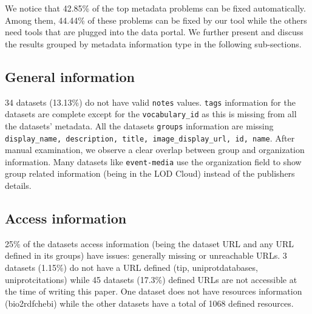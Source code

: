 \documentclass[runningheads,a4paper]{../../Util/LaTEX/llncs}
\begin{document}
We notice that 42.85\% of the top metadata problems can be fixed automatically. Among them, 44.44\% of these problems can be fixed by our tool while the others need tools that are plugged into the data portal. We further present and discuss the results grouped by metadata information type in the following sub-sections.

\subsection{General information}
34 datasets (13.13\%) do not have valid \texttt{notes} values. \texttt{tags} information for the datasets are complete except for the \texttt{vocabulary\_id} as this is missing from all the datasets' metadata. All the datasets \texttt{groups} information are missing \texttt{display\_name, description, title, image\_display\_url, id, name}. After manual examination, we observe a clear overlap between group and organization information. Many datasets like \texttt{event-media} use the organization field to show group related information (being in the LOD Cloud) instead of the publishers details.

\subsection{Access information}
25\% of the datasets access information (being the dataset URL and any URL defined in its groups) have issues: generally missing or unreachable URLs. 3 datasets (1.15\%) do not have a URL defined (tip, uniprot\-databases, uniprot\-citations) while 45 datasets (17.3\%) defined URLs are not accessible at the time of writing this paper. One dataset does not have resources information (bio2rdf\-chebi) while the other datasets have a total of 1068 defined resources.
\end{document}
